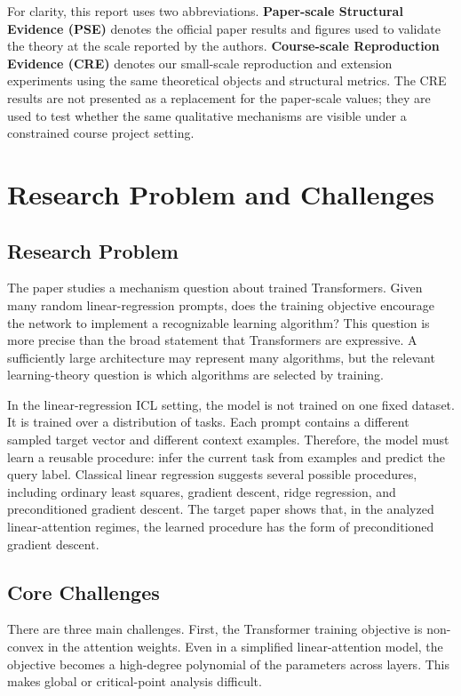 \documentclass[conference]{IEEEtran}
\begin{document}
For clarity, this report uses two abbreviations. \textbf{Paper-scale Structural Evidence (PSE)} denotes the official paper results and figures used to validate the theory at the scale reported by the authors. \textbf{Course-scale Reproduction Evidence (CRE)} denotes our small-scale reproduction and extension experiments using the same theoretical objects and structural metrics. The CRE results are not presented as a replacement for the paper-scale values; they are used to test whether the same qualitative mechanisms are visible under a constrained course project setting.

\section{Research Problem and Challenges}
\subsection{Research Problem}
The paper studies a mechanism question about trained Transformers. Given many random linear-regression prompts, does the training objective encourage the network to implement a recognizable learning algorithm? This question is more precise than the broad statement that Transformers are expressive. A sufficiently large architecture may represent many algorithms, but the relevant learning-theory question is which algorithms are selected by training.

In the linear-regression ICL setting, the model is not trained on one fixed dataset. It is trained over a distribution of tasks. Each prompt contains a different sampled target vector and different context examples. Therefore, the model must learn a reusable procedure: infer the current task from examples and predict the query label. Classical linear regression suggests several possible procedures, including ordinary least squares, gradient descent, ridge regression, and preconditioned gradient descent. The target paper shows that, in the analyzed linear-attention regimes, the learned procedure has the form of preconditioned gradient descent.

\subsection{Core Challenges}
There are three main challenges. First, the Transformer training objective is non-convex in the attention weights. Even in a simplified linear-attention model, the objective becomes a high-degree polynomial of the parameters across layers. This makes global or critical-point analysis difficult.
\end{document}
